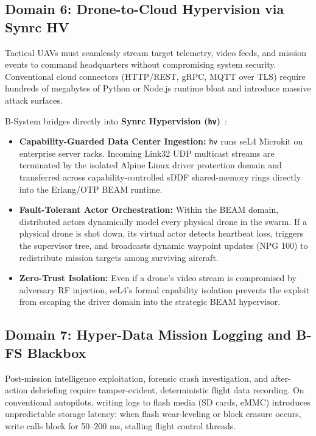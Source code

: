 \documentclass[10pt,journal,compsoc,twocolumn]{article}
\begin{document}
\subsection{Domain 6: Drone-to-Cloud Hypervision via Synrc HV}
Tactical UAVs must seamlessly stream target telemetry, video feeds, and mission events to command headquarters without compromising system security. Conventional cloud connectors (HTTP/REST, gRPC, MQTT over TLS) require hundreds of megabytes of Python or Node.js runtime bloat and introduce massive attack surfaces.

B-System bridges directly into \textbf{Synrc Hypervision (\texttt{hv})}~\cite{synrc_hv_spec}:
\begin{itemize}[leftmargin=*]
    \item \textbf{Capability-Guarded Data Center Ingestion:} \texttt{hv} runs seL4 Microkit on enterprise server racks. Incoming Link32 UDP multicast streams are terminated by the isolated Alpine Linux driver protection domain and transferred across capability-controlled sDDF shared-memory rings directly into the Erlang/OTP BEAM runtime.
    \item \textbf{Fault-Tolerant Actor Orchestration:} Within the BEAM domain, distributed actors dynamically model every physical drone in the swarm. If a physical drone is shot down, its virtual actor detects heartbeat loss, triggers the supervisor tree, and broadcasts dynamic waypoint updates (NPG 100) to redistribute mission targets among surviving aircraft.
    \item \textbf{Zero-Trust Isolation:} Even if a drone's video stream is compromised by adversary RF injection, seL4's formal capability isolation prevents the exploit from escaping the driver domain into the strategic BEAM hypervisor.
\end{itemize}

\subsection{Domain 7: Hyper-Data Mission Logging and B-FS Blackbox}
Post-mission intelligence exploitation, forensic crash investigation, and after-action debriefing require tamper-evident, deterministic flight data recording. On conventional autopilots, writing logs to flash media (SD cards, eMMC) introduces unpredictable storage latency: when flash wear-leveling or block erasure occurs, write calls block for 50--200 ms, stalling flight control threads.
\end{document}
